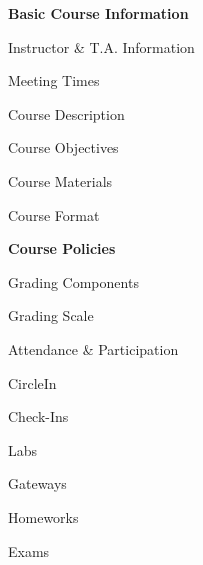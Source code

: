 \documentclass[11pt,letterpaper]{article}
\begin{document}
\mytitle


\begin{minipage}[t]{0.45\textwidth} %
{\bfseries\color{scred} Basic Course Information} \dotfill \pageref{course_info} \par
\hspace{0.3cm} Instructor \& T.A. Information \dotfill \pageref{instr_info} \par
\hspace{0.3cm} Meeting Times \dotfill \pageref{meetings} \par
\hspace{0.3cm} Course Description \dotfill \pageref{course_desc} \par
\hspace{0.3cm} Course Objectives \dotfill \pageref{course_obj} \par
\hspace{0.3cm} Course Materials \dotfill \pageref{course_mat} \par
\hspace{0.3cm} Course Format \dotfill \pageref{course_format} \par
{\bfseries\color{scred} Course Policies} \dotfill \pageref{course_policies} \par
\hspace{0.3cm} Grading Components \dotfill \pageref{grade_comp} \par
\hspace{0.3cm} Grading Scale \dotfill \pageref{grade_scale} \par
\hspace{0.3cm} Attendance \& Participation \dotfill \pageref{attend} \par
\hspace{0.3cm} CircleIn \dotfill \pageref{circlein} \par
\hspace{0.3cm} Check-Ins \dotfill \pageref{check} \par
\hspace{0.3cm} Labs \dotfill \pageref{labs} \par
\hspace{0.3cm} Gateways \dotfill \pageref{gateways} \par
\hspace{0.3cm} Homeworks \dotfill \pageref{hw} \par
\hspace{0.3cm} Exams \dotfill \pageref{exams} \par

\end{minipage}
\end{document}

